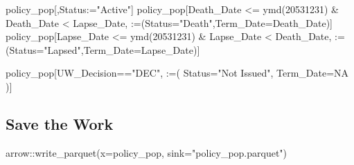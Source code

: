\documentclass[
  letterpaper,
  DIV=11,
  numbers=noendperiod]{scrartcl}
\newenvironment{Shaded}{\begin{snugshade}}{\end{snugshade}}
\newcommand{\AttributeTok}[1]{\textcolor[rgb]{0.40,0.45,0.13}{#1}}
\newcommand{\ConstantTok}[1]{\textcolor[rgb]{0.56,0.35,0.01}{#1}}
\newcommand{\DecValTok}[1]{\textcolor[rgb]{0.68,0.00,0.00}{#1}}
\newcommand{\ErrorTok}[1]{\textcolor[rgb]{0.68,0.00,0.00}{#1}}
\newcommand{\FunctionTok}[1]{\textcolor[rgb]{0.28,0.35,0.67}{#1}}
\newcommand{\NormalTok}[1]{\textcolor[rgb]{0.00,0.23,0.31}{#1}}
\newcommand{\SpecialCharTok}[1]{\textcolor[rgb]{0.37,0.37,0.37}{#1}}
\newcommand{\StringTok}[1]{\textcolor[rgb]{0.13,0.47,0.30}{#1}}
\begin{document}
\begin{Shaded}
\begin{Highlighting}[]
\NormalTok{policy\_pop[,Status}\SpecialCharTok{:}\ErrorTok{=}\StringTok{"Active"}\NormalTok{]}
\NormalTok{policy\_pop[Death\_Date }\SpecialCharTok{\textless{}=} \FunctionTok{ymd}\NormalTok{(}\DecValTok{20531231}\NormalTok{) }\SpecialCharTok{\&}\NormalTok{ Death\_Date }\SpecialCharTok{\textless{}}\NormalTok{ Lapse\_Date,}
           \StringTok{\textasciigrave{}}\AttributeTok{:=}\StringTok{\textasciigrave{}}\NormalTok{(}\AttributeTok{Status=}\StringTok{"Death"}\NormalTok{,}\AttributeTok{Term\_Date=}\NormalTok{Death\_Date)]}
\NormalTok{policy\_pop[Lapse\_Date }\SpecialCharTok{\textless{}=} \FunctionTok{ymd}\NormalTok{(}\DecValTok{20531231}\NormalTok{) }\SpecialCharTok{\&}\NormalTok{ Lapse\_Date }\SpecialCharTok{\textless{}}\NormalTok{ Death\_Date,}
           \StringTok{\textasciigrave{}}\AttributeTok{:=}\StringTok{\textasciigrave{}}\NormalTok{(}\AttributeTok{Status=}\StringTok{"Lapsed"}\NormalTok{,}\AttributeTok{Term\_Date=}\NormalTok{Lapse\_Date)]}

\NormalTok{policy\_pop[UW\_Decision}\SpecialCharTok{==}\StringTok{"DEC"}\NormalTok{,}
           \StringTok{\textasciigrave{}}\AttributeTok{:=}\StringTok{\textasciigrave{}}\NormalTok{(}
             \AttributeTok{Status=}\StringTok{"Not Issued"}\NormalTok{,}
             \AttributeTok{Term\_Date=}\ConstantTok{NA}
\NormalTok{           )]}
\end{Highlighting}
\end{Shaded}

\hypertarget{save-the-work}{%
\subsection{Save the Work}\label{save-the-work}}

\begin{Shaded}
\begin{Highlighting}[]
\NormalTok{arrow}\SpecialCharTok{::}\FunctionTok{write\_parquet}\NormalTok{(}\AttributeTok{x=}\NormalTok{policy\_pop,}
                     \AttributeTok{sink=}\StringTok{"policy\_pop.parquet"}\NormalTok{)}
\end{Highlighting}
\end{Shaded}
\end{document}
